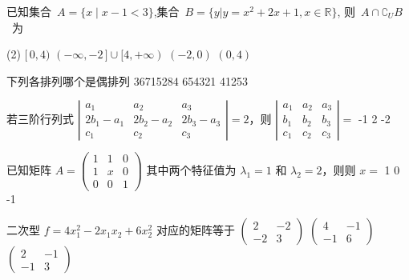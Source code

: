 \begin{question}
已知集合~$A=\{x\mid {x-1}<3 \}$,集合~$B=\{y|
  y=x^2+2x+1,x\in\mathbb{R}\}$, 则~$A\cap \complement_U B$~为

  \begin{tasks}(2)
    \task $[\,0,4)$
    \task $(-\infty,-2\,]\cup[4,+\infty)$
    \task $(-2,0)$
    \task $(0,4)$
  \end{tasks}
\end{question}


\begin{question}
下列各排列哪个是偶排列 
	{36715284}
	{654321}
	{41253}
\end{question}



\begin{question}
若三阶行列式 $\left|\begin{array}{ccc}
  a_1 & a_2 & a_3\\
  2 b_1 - a_1 & 2 b_2 - a_2 & 2 b_3 - a_3\\
  c_1 & c_2 & c_3
\end{array}\right| = 2$，则 $\left|\begin{array}{ccc}
  a_1 & a_2 & a_3\\
  b_1 & b_2 & b_3\\
  c_1 & c_2 & c_3
\end{array}\right|=$ 
	{-1}
	{2}
	{-2}
\end{question}



\begin{question}
已知矩阵 $A = \left(\begin{array}{ccc}
  1 & 1 & 0\\
  1 & x & 0\\
  0 & 0 & 1
\end{array}\right)$ 其中两个特征值为 $\lambda_1 = 1$ 和 $\lambda_2
= 2$，则则 $x=$ 
	{1}
	{0}
	{-1}
\end{question}



\begin{question}
二次型 $f = 4 x_1^2 - 2 x_1 x_2 + 6 x_2^2$ 对应的矩阵等于 
	{$\left(\begin{array}{cc}
  2 & - 2\\
  - 2 & 3
\end{array}\right)$}
	{$\left(\begin{array}{cc}
  4 & - 1\\
  - 1 & 6
\end{array}\right)$}
	{$\left(\begin{array}{cc}
  2 & - 1\\
  - 1 & 3
\end{array}\right)$}
\end{question}



